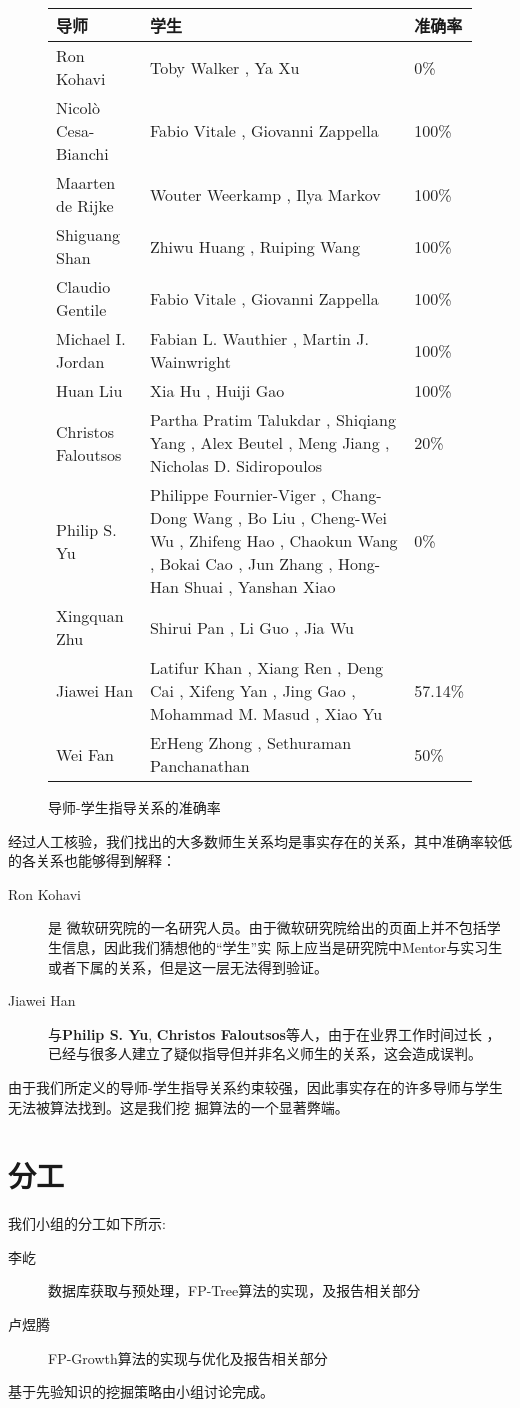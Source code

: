 \documentclass[a4paper]{article}
\begin{document}
\begin{figure}[ht]
  \begin{center}
    \begin{tabular}{lm{9cm}l}
      \hline
      导师 & 学生 & 准确率 \\
      \hline
      Ron Kohavi & Toby Walker , Ya Xu  & 0\%\\
      Nicolò Cesa-Bianchi & Fabio Vitale , Giovanni Zappella  & 100\%\\
      Maarten de Rijke & Wouter Weerkamp , Ilya Markov  & 100\%\\
      Shiguang Shan & Zhiwu Huang , Ruiping Wang  & 100\%\\
      Claudio Gentile & Fabio Vitale , Giovanni Zappella  & 100\%\\
      Michael I. Jordan & Fabian L. Wauthier , Martin J. Wainwright  & 100\% \\
      Huan Liu & Xia Hu , Huiji Gao  & 100\%\\
      Christos Faloutsos & Partha Pratim Talukdar , Shiqiang Yang , Alex Beutel , Meng Jiang , Nicholas D.
      Sidiropoulos  & 20\%\\
      Philip S. Yu & Philippe Fournier-Viger , Chang-Dong Wang , Bo Liu , Cheng-Wei Wu , Zhifeng Hao ,
      Chaokun Wang , Bokai Cao , Jun Zhang , Hong-Han Shuai , Yanshan Xiao  & 0\%\\
      Xingquan Zhu & Shirui Pan , Li Guo , Jia Wu  & \\
      Jiawei Han & Latifur Khan , Xiang Ren , Deng Cai , Xifeng Yan , Jing Gao , Mohammad M. Masud , Xiao
      Yu  & 57.14\%\\
      Wei Fan & ErHeng Zhong , Sethuraman Panchanathan  & 50\%\\
      \hline
    \end{tabular}
  \end{center}
  \caption{导师-学生指导关系的准确率}
  \label{supervising}
\end{figure}

经过人工核验，我们找出的大多数师生关系均是事实存在的关系，其中准确率较低的各关系也能够得到解释：
\begin{description}
  \item[Ron Kohavi] 是
    微软研究院的一名研究人员。由于微软研究院给出的页面上并不包括学生信息，因此我们猜想他的``学生''实
    际上应当是研究院中Mentor与实习生或者下属的关系，但是这一层无法得到验证。
  \item[Jiawei Han] 与\textbf{Philip S. Yu}, \textbf{Christos Faloutsos}等人，由于在业界工作时间过长
    ，已经与很多人建立了疑似指导但并非名义师生的关系，这会造成误判。
\end{description}

由于我们所定义的导师-学生指导关系约束较强，因此事实存在的许多导师与学生无法被算法找到。这是我们挖
掘算法的一个显著弊端。

\section{分工}
\noindent 我们小组的分工如下所示:
\begin{description}
  \item[李屹] 数据库获取与预处理，FP-Tree算法的实现，及报告相关部分
  \item[卢煜腾] FP-Growth算法的实现与优化及报告相关部分
\end{description}
基于先验知识的挖掘策略由小组讨论完成。
\end{document}
